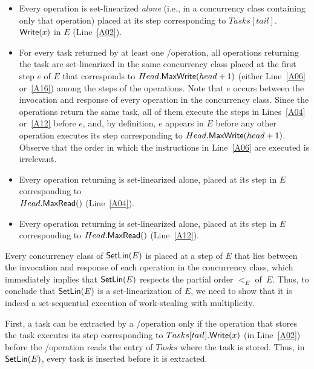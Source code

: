 \begin{proofT}
\begin{itemize}

\item Every \Put operation is set-linearized \emph{alone} (i.e., in a concurrency class containing only that operation) placed at its step corresponding to \(Tasks[tail]\). \({\sf Write}(x)\) in \(E\) (Line~\ref{A02}).

\item For every task returned by at least one \Take/\Steal operation, all operations returning the task are set-linearized in the same concurrency class placed at the first step \(e\) of \(E\) that corresponds to \(Head.{\sf MaxWrite}(head+1)\) (either Line~\ref{A06} or~\ref{A16}) among the steps of the operations. Note that \(e\) occurs between the invocation and response of every operation in the concurrency class. Since the operations return the same task, all of them execute the \MaxR steps in Lines~\ref{A04} or~\ref{A12} before \(e\), and, by definition, \(e\) appears in \(E\) before any other operation executes its step corresponding to \(Head.{\sf MaxWrite}(head+1)\). Observe that the order in which the instructions in Line~\ref{A06} are executed is irrelevant.

\item Every \Take operation returning \epty is set-linearized alone, placed at its step in \(E\) corresponding to\\ \(Head.{\sf MaxRead}()\) (Line~\ref{A04}).

\item Every \Steal operation returning \epty is set-linearized alone, placed at its step in \(E\) corresponding to \(Head.{\sf MaxRead}()\) (Line~\ref{A12}).

\end{itemize}

Every concurrency class of \({\sf SetLin}(E)\) is placed at a step of \(E\) that lies between the invocation and response of each operation in the concurrency class, which immediately implies that \({\sf SetLin}(E)\) respects the partial order \(<_E\) of~\(E\). Thus, to conclude that \({\sf SetLin}(E)\) is a set-linearization of \(E\), we need to show that it is indeed a set-sequential execution of work-stealing with multiplicity.

First, a task can be extracted by a \Take/\Steal operation only if the \Put operation that stores the task executes its step corresponding to \(Tasks[tail].{\sf Write}(x)\) (in Line~\ref{A02}) before the \Take/\Steal operation reads the entry of \(Tasks\) where the task is stored. Thus, in \({\sf SetLin}(E)\), every task is inserted before it is extracted.


\end{proofT}
